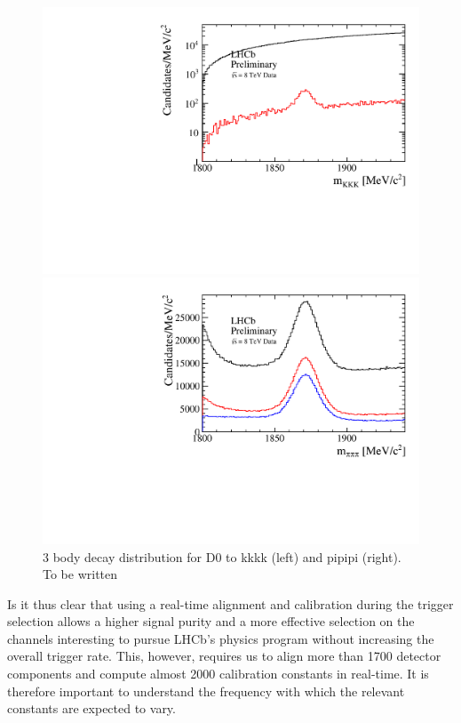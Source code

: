 \begin{figure}[h]
\begin{minipage}{0.5\columnwidth}
\includegraphics[width=\columnwidth]{../figures/kkk_PIDK_trigger_log}
\end{minipage}\hspace{2pc}%
\begin{minipage}{0.5\columnwidth}
\includegraphics[width=\columnwidth]{../figures/ppp_PIDK_trigger}
\end{minipage} 
\caption{\label{fig:CharmPID} 3 body decay distribution for D0 to  kkkk (left) and pipipi (right). To be written  }
\end{figure}

Is it thus clear that using a real-time alignment and calibration during the
trigger selection allows a higher signal purity and a more effective selection
on the channels interesting to pursue LHCb's physics program without increasing
the overall trigger rate. This, however, requires us
to align more than 1700 detector components and compute almost 2000
calibration constants in real-time. It is therefore important to understand the frequency
with which the relevant constants are expected to vary.

